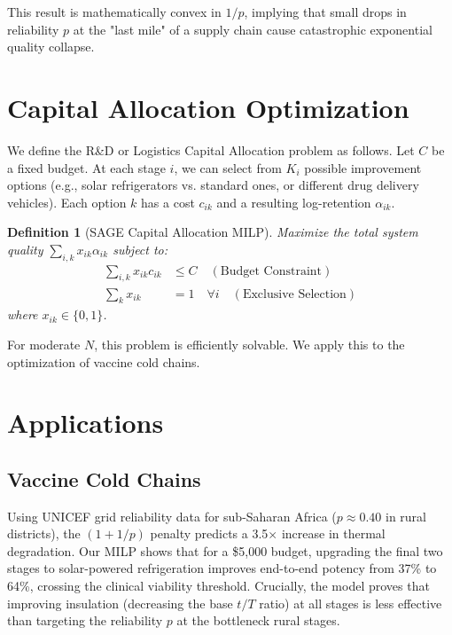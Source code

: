 \documentclass[aps,pra,reprint,amsmath,amssymb,superscriptaddress]{revtex4-2}
\newtheorem{definition}{Definition}
\begin{document}
This result is mathematically convex in $1/p$, implying that small drops in reliability $p$ at the "last mile" of a supply chain cause catastrophic exponential quality collapse.


\section{Capital Allocation Optimization}

We define the R\&D or Logistics Capital Allocation problem as follows. Let $C$ be a fixed budget. At each stage $i$, we can select from $K_i$ possible improvement options (e.g., solar refrigerators vs. standard ones, or different drug delivery vehicles). Each option $k$ has a cost $c_{ik}$ and a resulting log-retention $\alpha_{ik}$.

\begin{definition}[SAGE Capital Allocation MILP]
Maximize the total system quality $\sum_{i,k} x_{ik} \alpha_{ik}$ subject to:
\begin{align}
\sum_{i,k} x_{ik} c_{ik} &\leq C \quad (\text{Budget Constraint}) \\
\sum_{k} x_{ik} &= 1 \quad \forall i \quad (\text{Exclusive Selection})
\end{align}
where $x_{ik} \in \{0, 1\}$.
\end{definition}

For moderate $N$, this problem is efficiently solvable. We apply this to the optimization of vaccine cold chains.


\section{Applications}

\subsection{Vaccine Cold Chains}
Using UNICEF grid reliability data for sub-Saharan Africa ($p \approx 0.40$ in rural districts), the $(1+1/p)$ penalty predicts a 3.5$\times$ increase in thermal degradation. Our MILP shows that for a \$5,000 budget, upgrading the final two stages to solar-powered refrigeration improves end-to-end potency from 37\% to 64\%, crossing the clinical viability threshold. Crucially, the model proves that improving insulation (decreasing the base $t/T$ ratio) at all stages is less effective than targeting the reliability $p$ at the bottleneck rural stages.
\end{document}
